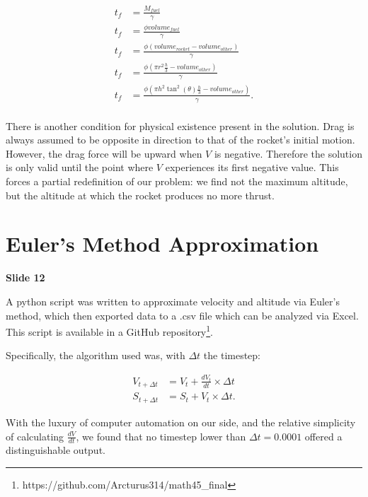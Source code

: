 \documentclass[]{article}
\begin{document}
\begin{center}
	\begin{align*}
	t_f &= \frac{M_{fuel}}{\gamma} \\
	t_f &= \frac{\phi volume_{fuel}}{\gamma} \\
	t_f &= \frac{\phi (volume_{rocket} - volume_{other}) } {\gamma} \\
	t_f &= \frac{\phi (\pi r^2 \frac{h}{3} - volume_{other}) } {\gamma} \\
	t_f &= \frac{\phi (\pi h^2 \tan^2(\theta) \frac{h}{3} - volume_{other}) } {\gamma} . \\
	\end{align*}
\end{center}

There is another condition for physical existence present in the solution. Drag is always assumed to be opposite in direction to that of the rocket's initial motion. However, the drag force will be upward when $V$ is negative. Therefore the solution is only valid until the point where $V$ experiences its first negative value. This forces a partial redefinition of our problem: we find not the maximum altitude, but the altitude at which the rocket produces no more thrust.

\section{Euler's Method Approximation}

\textbf{Slide 12}

A python script was written to approximate velocity and altitude via Euler's method, which then exported data to a .csv file which can be analyzed via Excel. This script is available in a GitHub repository\footnote{https://github.com/Arcturus314/math45\_final}.


 Specifically, the algorithm used was, with $\Delta t$ the timestep:

\begin{center}
	\begin{align*}
	V_{t+\Delta t} &= V_{t} + \frac{dV_{t}}{dt}\times \Delta t \\
	S_{t+\Delta t} &= S_{t} + V_{t}\times \Delta t .
	\end{align*}
\end{center}

With the luxury of computer automation on our side, and the relative simplicity of calculating $\frac{dV}{dt}$, we found that no timestep lower than $\Delta t = 0.0001$ offered a distinguishable output.
\end{document}
